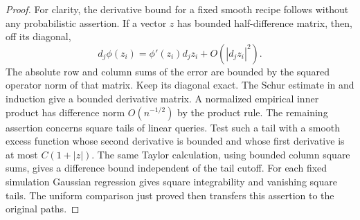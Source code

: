 \begin{proof}
For clarity, the derivative bound for a fixed smooth recipe follows
without any probabilistic assertion.  If a vector $z$ has bounded
half-difference matrix, then, off its diagonal,
\[
 d_j\phi(z_i)=\phi'(z_i)d_jz_i
                  +O(|d_jz_i|^2).
\]
The absolute row and column sums of the error are bounded by the
squared operator norm of that matrix.  Keep its diagonal exact.
The Schur estimate in  and
induction give a bounded derivative matrix.  A normalized empirical
inner product has difference norm $O(n^{-1/2})$ by the product rule.
The remaining assertion concerns square tails of linear queries.
Test such a tail with a smooth excess
function whose second derivative is bounded and whose first derivative
is at most $C(1+|z|)$.  The same Taylor calculation, using bounded column
square sums, gives a difference bound independent of the tail cutoff.
For each fixed simulation Gaussian regression gives square integrability
and vanishing square tails.  The uniform comparison just proved then
transfers this assertion to the original paths.
\end{proof}
